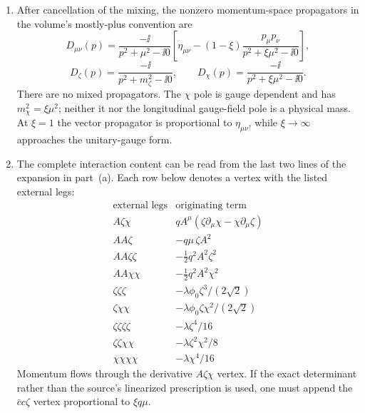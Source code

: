 \begin{enumerate}
\begin{enumerate}
    \item[(c)]
    After cancellation of the mixing, the nonzero momentum-space
    propagators in the volume's mostly-plus convention are
    \[
      \boxed{
      D_{\mu\nu}(p)=
        \frac{-\ii}{p^2+\mu^2-\ii0}
        \left[
          \eta_{\mu\nu}
          -(1-\xi)\frac{p_\mu p_\nu}
            {p^2+\xi\mu^2-\ii0}
        \right],}
    \]
    \[
      \boxed{
      D_\zeta(p)=\frac{-\ii}{p^2+m_\zeta^2-\ii0},
      \qquad
      D_\chi(p)=\frac{-\ii}{p^2+\xi\mu^2-\ii0}.}
    \]
    There are no mixed propagators.  The \(\chi\) pole is gauge dependent
    and has \(m_\chi^2=\xi\mu^2\); neither it nor the longitudinal
    gauge-field pole is a physical mass.  At \(\xi=1\) the vector
    propagator is proportional to \(\eta_{\mu\nu}\), while
    \(\xi\to\infty\) approaches the unitary-gauge form.

    \item[(d)]
    The complete interaction content can be read from the last two lines
    of the expansion in part~(a).  Each row below denotes a vertex with
    the listed external legs:
    \[
      \begin{array}{c|l}
        \text{external legs}&\text{originating term}\\ \hline
        A\zeta\chi&
          qA^\mu(\zeta\partial_\mu\chi-\chi\partial_\mu\zeta)\\
        AA\zeta&-q\mu\,\zeta A^2\\
        AA\zeta\zeta&-\tfrac12q^2A^2\zeta^2\\
        AA\chi\chi&-\tfrac12q^2A^2\chi^2\\
        \zeta\zeta\zeta&
          -\lambda\phi_0\zeta^3/(2\sqrt2)\\
        \zeta\chi\chi&
          -\lambda\phi_0\zeta\chi^2/(2\sqrt2)\\
        \zeta\zeta\zeta\zeta&-\lambda\zeta^4/16\\
        \zeta\zeta\chi\chi&-\lambda\zeta^2\chi^2/8\\
        \chi\chi\chi\chi&-\lambda\chi^4/16
      \end{array}
    \]
    Momentum flows through the derivative \(A\zeta\chi\) vertex.  If the
    exact determinant rather than the source's linearized prescription is
    used, one must append the
    \(\bar c c\zeta\) vertex proportional to \(\xi q\mu\).
  \end{enumerate}


\end{enumerate}
